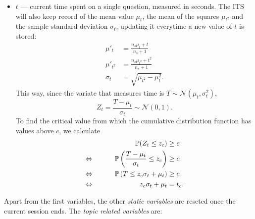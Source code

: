 \documentclass{article}
\newcommand{\0}{\mathbbold{0}}
\newcommand{\1}{\mathds{1}}
\newcommand{\LRA}{\Leftrightarrow\mkern40mu}
\begin{document}
\begin{itemize}
    \item $t$ — current time spent on a single question, measured in seconds. The ITS will also keep record of the mean value $\mu_t$, the mean of the squares $\mu_{t^2}$ and the sample standard deviation $\sigma_t$, updating it everytime a new value of $t$ is stored:
    \begin{align*}
        \mu'_t &= \frac{n_s\mu_t + t}{n_s + 1} \\
        \mu'_{t^2} &= \frac{n_s\mu_{t^2} + t^2}{n_s + 1} \\
        \sigma_t &= \sqrt{\mu_{t^2} - \mu_t^2}.
    \end{align*}
    This way, since the variate that measures time is $T \sim \mathcal{N}(\mu_t, \sigma^2_t)$,
    $$ Z_t = \frac{T-\mu_t}{\sigma_t} \sim \mathcal{N}(0,1). $$
    To find the critical value from which the cumulative distribution function has values above $c$, we calculate
    \begin{alignat*}{2}
        && \mathbb{P}(Z_t \le z_c) &\ge c \\
        \LRA && \mathbb{P}\left(\frac{T-\mu_t}{\sigma_t} \le z_c\right) &\ge c \\
        \LRA && \mathbb{P}\left(T \le z_c\sigma_t + \mu_t\right) &\ge c \\
        \LRA && z_c\sigma_t + \mu_t &= t_c.
    \end{alignat*}
\end{itemize}
Apart from the first variables, the other \textsl{static variables} are reseted once the current session ends. The \textsl{topic related variables} are:
\end{document}
